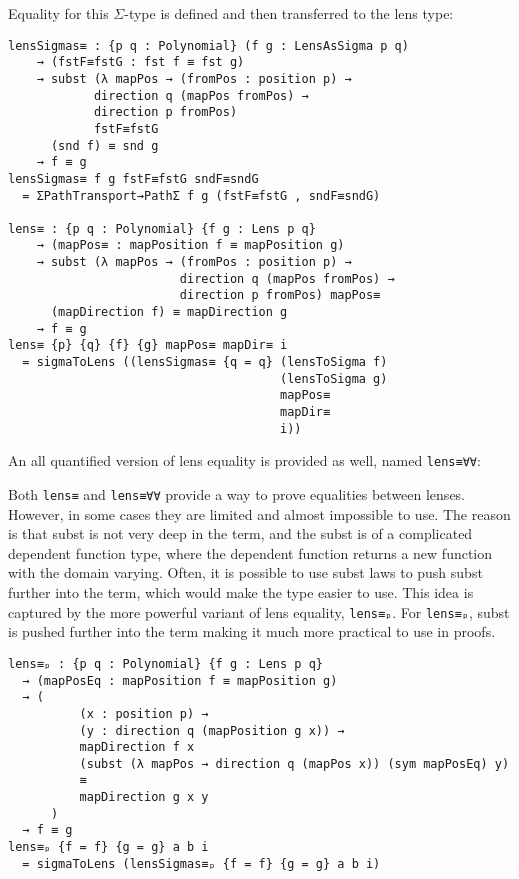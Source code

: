 Equality for this $\Sigma$-type is defined and then transferred to the lens type:

\begin{verbatim}
lensSigmas≡ : {p q : Polynomial} (f g : LensAsSigma p q)
    → (fstF≡fstG : fst f ≡ fst g)
    → subst (λ mapPos → (fromPos : position p) → 
            direction q (mapPos fromPos) → 
            direction p fromPos) 
            fstF≡fstG
      (snd f) ≡ snd g
    → f ≡ g
lensSigmas≡ f g fstF≡fstG sndF≡sndG 
  = ΣPathTransport→PathΣ f g (fstF≡fstG , sndF≡sndG)

lens≡ : {p q : Polynomial} {f g : Lens p q}
    → (mapPos≡ : mapPosition f ≡ mapPosition g) 
    → subst (λ mapPos → (fromPos : position p) → 
                        direction q (mapPos fromPos) → 
                        direction p fromPos) mapPos≡ 
      (mapDirection f) ≡ mapDirection g
    → f ≡ g
lens≡ {p} {q} {f} {g} mapPos≡ mapDir≡ i
  = sigmaToLens ((lensSigmas≡ {q = q} (lensToSigma f) 
                                      (lensToSigma g) 
                                      mapPos≡ 
                                      mapDir≡ 
                                      i))
\end{verbatim}

An all quantified version of lens equality is provided as well, named \texttt{lens≡∀∀}:

Both \texttt{lens≡} and \texttt{lens≡∀∀} provide a way to prove equalities between lenses.
However, in some cases they are limited and almost impossible to use.
The reason is that subst is not very deep in the term, and the subst is of a complicated dependent function type, where the dependent function returns a new function with the domain varying.
Often, it is possible to use subst laws to push subst further into the term, which would make the type easier to use.
This idea is captured by the more powerful variant of lens equality, \texttt{lens≡ₚ}.
For \texttt{lens≡ₚ}, subst is pushed further into the term making it much more practical to use in proofs.

\begin{verbatim}
lens≡ₚ : {p q : Polynomial} {f g : Lens p q}
  → (mapPosEq : mapPosition f ≡ mapPosition g)
  → (
          (x : position p) → 
          (y : direction q (mapPosition g x)) → 
          mapDirection f x  
          (subst (λ mapPos → direction q (mapPos x)) (sym mapPosEq) y) 
          ≡ 
          mapDirection g x y
      )
  → f ≡ g
lens≡ₚ {f = f} {g = g} a b i
  = sigmaToLens (lensSigmas≡ₚ {f = f} {g = g} a b i)
\end{verbatim}

